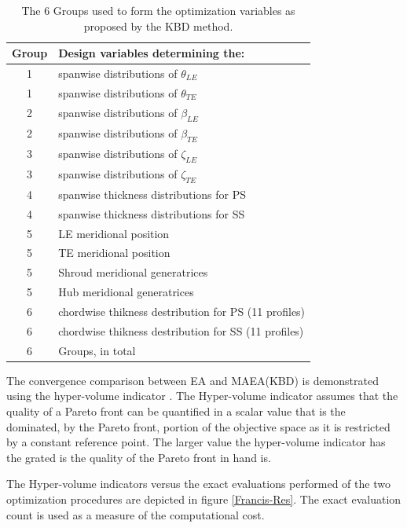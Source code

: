 \begin{table}[h!]
\begin{center}
\begin{tabular}{ |c|l| }
\hline

Group              & Design variables determining the:\\
\hline
1 & spanwise distributions of $\theta_{LE}$\\
\hline
1 & spanwise distributions of $\theta_{TE}$\\
\hline
2 & spanwise distributions of $\beta_{LE}$\\
\hline
2 & spanwise distributions of $\beta_{TE}$\\
\hline
3 & spanwise distributions of $\zeta_{LE}$\\
\hline
3 & spanwise distributions of $\zeta_{TE}$\\
\hline
4 & spanwise thickness distributions for PS \\
\hline
4 & spanwise thickness distributions for SS\\
\hline
5 & LE meridional position\\
\hline
5 & TE meridional position\\
\hline
5 & Shroud meridional generatrices \\
\hline
5 & Hub meridional generatrices\\
\hline
6 & chordwise thikness destribution for PS (11 profiles)\\
\hline
6 & chordwise thikness destribution for SS (11 profiles)\\
\hline
\hline
6 & Groups, in total \\
\hline   
\end{tabular}
\caption{
The $6$ Groups used to form the optimization variables as proposed by the KBD method.}
\label{design_groups}
\end{center}
\end{table}

The convergence comparison between EA and MAEA(KBD) is demonstrated using the hyper-volume indicator \cite{Zitz2007}. The Hyper-volume indicator assumes that the quality of a Pareto front can be quantified in a scalar value that is the dominated, by the Pareto front, portion of the objective space as it is restricted by a constant reference point.  The larger value the hyper-volume indicator has the grated is the quality of the Pareto front in hand is.

The Hyper-volume indicators versus the exact evaluations performed of the two optimization procedures are depicted in figure \ref{Francis-Res}. The exact evaluation count is used as a measure of the computational cost.     


